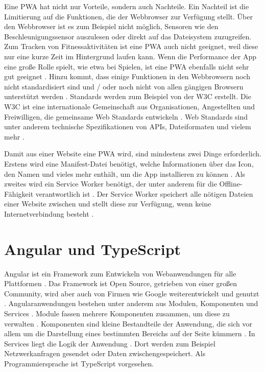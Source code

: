 Eine \ac{PWA} hat nicht nur Vorteile, sondern auch Nachteile. Ein Nachteil ist die Limitierung auf die Funktionen, die der Webbrowser zur Verfügung stellt. Über den Webbrowser ist es zum Beispiel nicht möglich, Sensoren wie den Beschleunigungssensor auszulesen oder direkt auf das Dateisystem zuzugreifen. Zum Tracken von Fitnessaktivitäten ist eine \ac{PWA} auch nicht geeignet, weil diese nur eine kurze Zeit im Hintergrund laufen kann. Wenn die Performance der App eine große Rolle spielt, wie etwa bei Spielen, ist eine \ac{PWA} ebenfalls nicht sehr gut geeignet \autocite{biorn2017}. Hinzu kommt, dass einige Funktionen in den Webbrowsern noch nicht standardisiert sind und / oder noch nicht von allen gängigen Browsern unterstützt werden \autocite{majchrzak2018} \autocite{biorn2017}. Standards werden zum Beispiel von der \ac{W3C} erstellt. Die \ac{W3C} ist eine internationale Gemeinschaft aus Organisationen, Angestellten und Freiwilligen, die gemeinsame Web Standards entwickeln \autocite{w3}. Web Standards sind unter anderem technische Spezifikationen von \acp{API}, Dateiformaten und vielem mehr \autocite{w3-standards}.

Damit aus einer Website eine \ac{PWA} wird, sind mindestens zwei Dinge erforderlich. Erstens wird eine Manifest-Datei benötigt, welche Informationen über das Icon, den Namen und vieles mehr enthält, um die App installieren zu können \autocite{Hajian2019} \autocite{Rojas2020}. Als zweites wird ein Service Worker benötigt, der unter anderem für die Offline-Fähigkeit verantwortlich ist \autocite{Rojas2020}. Der Service Worker speichert alle nötigen Dateien einer Website zwischen und stellt diese zur Verfügung, wenn keine Internetverbindung besteht \autocite{Rojas2020}.

\section{Angular und TypeScript}
Angular ist ein Framework zum Entwickeln von Webanwendungen für alle Plattformen \autocite{angular-io}. Das Framework ist Open Source, getrieben von einer großen Community, wird aber auch von Firmen wie Google weiterentwickelt und genutzt \autocite{angular-io}. Angularanwendungen bestehen unter anderem aus Modulen, Komponenten und Services \autocite{angular-start}. Module fassen mehrere Komponenten zusammen, um diese zu verwalten \autocite{angular-start}. Komponenten sind kleine Bestandteile der Anwendung, die sich vor allem um die Darstellung eines bestimmten Bereichs auf der Seite kümmern \autocite{angular-start}. In Services liegt die Logik der Anwendung \autocite{angular-start}. Dort werden zum Beispiel Netzwerkanfragen gesendet oder Daten zwischengespeichert. Als Programmiersprache ist TypeScript vorgesehen. 

